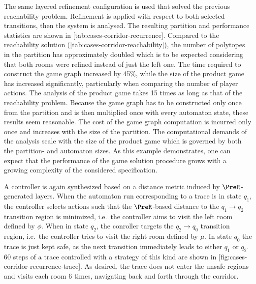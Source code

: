    The same layered refinement configuration is used that solved the previous reachability problem.
    Refinement is applied with respect to both selected transitions, then the system is analysed.
    The resulting partition and performance statistics are shown in [tab:cases-corridor-recurrence].
    Compared to the reachability solution ([tab:cases-corridor-reachability]), the number of polytopes in the partition has approximately doubled which is to be expected considering that both rooms were refined instead of just the left one.
    The time required to construct the game graph increased by 45\%, while the size of the product game has increased significantly, particularly when comparing the number of player actions.
    The analysis of the product game takes 15 times as long as that of the reachability problem.
    Because the game graph has to be constructed only once from the partition and is then multiplied once with every automaton state, these results seem reasonable.
    The cost of the game graph computation is incurred only once and increases with the size of the partition.
    The computational demands of the analysis scale with the size of the product game which is governed by both the partition- and automaton sizes.
    As this example demonstrates, one can expect that the performance of the game solution procedure grows with a growing complexity of the considered specification.
    
    A controller is again synthesized based on a distance metric induced by $\PreR$-generated layers.
    When the automaton run corresponding to a trace is in state $q_1$, the controller selects actions such that the $\PreR$-based distance to the $q_1 \rightarrow q_2$ transition region is minimized, i.e.\ the controller aims to visit the left room defined by $\phi$.
    When in state $q_2$, the conroller targets the $q_2 \rightarrow q_0$ transition region, i.e.\ the controller tries to visit the right room defined by $\mu$.
    In state $q_0$ the trace is just kept safe, as the next transition immediately leads to either $q_1$ or $q_2$.
    60 steps of a trace controlled with a strategy of this kind are shown in [fig:cases-corridor-recurrence-trace].
    As desired, the trace does not enter the unsafe regions and visits each room 6 times, navigating back and forth through the corridor.


\stopsubsection


